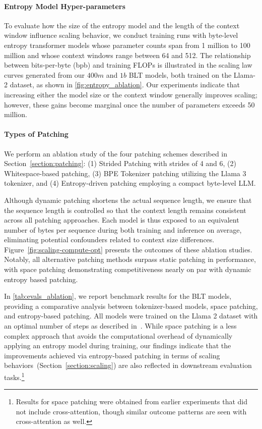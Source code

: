 \paragraph{Entropy Model Hyper-parameters} To evaluate how the size of the entropy model and the length of the context window influence scaling behavior, we conduct training runs with byte-level entropy transformer models whose parameter counts span from 1 million to 100 million and whose context windows range between 64 and 512. The relationship between bits-per-byte (bpb) and training FLOPs is illustrated in the scaling law curves generated from our $400m$ and $1b$ {\textsc BLT} models, both trained on the Llama-2 dataset, as shown in \autoref{fig:entropy_ablation}. Our experiments indicate that increasing either the model size or the context window generally improves scaling; however, these gains become marginal once the number of parameters exceeds 50 million.

\paragraph{Types of Patching}

We perform an ablation study of the four patching schemes described in Section~\ref{section:patching}: (1) Strided Patching with strides of 4 and 6, (2) Whitespace-based patching, (3) BPE Tokenizer patching utilizing the Llama 3 tokenizer, and (4) Entropy-driven patching employing a compact byte-level LLM.

Although dynamic patching shortens the actual sequence length, we ensure that the sequence length is controlled so that the context length remains consistent across all patching approaches. Each model is thus exposed to an equivalent number of bytes per sequence during both training and inference on average, eliminating potential confounders related to context size differences. Figure~\ref{fig:scaling-compute-opt} presents the outcomes of these ablation studies. Notably, all alternative patching methods surpass static patching in performance, with space patching demonstrating competitiveness nearly on par with dynamic entropy based patching.

In \autoref{tab:evals_ablation}, we report benchmark results for the {\textsc BLT} models, providing a comparative analysis between tokenizer-based models, space patching, and entropy-based patching. All models were trained on the Llama 2 dataset with an optimal number of steps as described in~\citep{dubey2024llama}. While space patching is a less complex approach that avoids the computational overhead of dynamically applying an entropy model during training, our findings indicate that the improvements achieved via entropy-based patching in terms of scaling behaviors~(Section~\ref{section:scaling}) are also reflected in downstream evaluation tasks.\footnote{Results for space patching were obtained from earlier experiments that did not include cross-attention, though similar outcome patterns are seen with cross-attention as well.}

